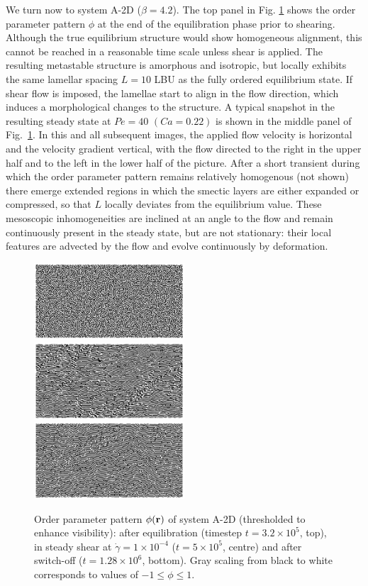 \documentclass[8.5pt,twoside,twocolumn]{article}
\newcommand{\e}[1]{\times10^{#1}}
\begin{document}
We turn now to system A-2D ($\beta = 4.2$). The top panel in Fig. \ref{fig1} shows the order parameter pattern $\phi$ at the end of the equilibration phase prior to shearing.
Although the true equilibrium structure would show homogeneous alignment, this cannot be reached in a reasonable time scale unless shear is applied. The resulting metastable structure is amorphous and isotropic, but locally exhibits the same lamellar spacing $L = 10$ LBU as the fully ordered equilibrium state.
If shear flow is imposed, the lamellae start to align in the flow direction, which induces a morphological changes to the structure. A typical snapshot in the resulting steady state at $Pe = 40$ $(Ca = 0.22)$ is shown in the middle panel of Fig.~\ref{fig1}. In this and all subsequent images, the applied flow velocity is horizontal and the velocity gradient vertical, with the flow directed to the right in the upper half and to the left in the lower half of the picture. After a short transient during which the order parameter pattern remains relatively homogenous (not shown) there emerge extended regions in which the smectic layers are either expanded or compressed, so that $L$ locally deviates from the equilibrium value. These mesoscopic inhomogeneities are inclined at an angle to the flow and remain continuously present in the steady state, but are not stationary: their local features are advected by the flow and evolve continuously by deformation. 
\begin{figure}[htp]
\centering
\includegraphics[angle=0,width=0.5\textwidth]{phi_run703_320.jpg}\\
\includegraphics[angle=0,width=0.5\textwidth]{phi_run704_500.jpg}\\
\includegraphics[angle=0,width=0.5\textwidth]{phi_run705_1280.jpg}
\caption{Order parameter pattern $\phi({\bf r})$ of system A-2D (thresholded to enhance visibility): after equilibration (timestep $t=3.2\e{5}$, top), in steady shear at $\dot{\gamma}=1\times10^{-4}$ ($t=5\e{5}$, centre) and after switch-off ($t=1.28\e{6}$, bottom). Gray scaling from black to white corresponds to values of $-1\le\phi\le1$.}
\label{fig1}
\end{figure}
\end{document}
